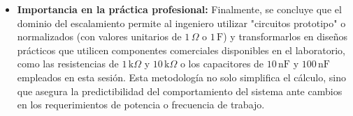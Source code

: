 \begin{itemize}
	\item \textbf{Importancia en la práctica profesional:} Finalmente, se concluye que el dominio del escalamiento permite al ingeniero utilizar "circuitos prototipo" o normalizados (con valores unitarios de $1\,\Omega$ o $1\,\text{F}$) y transformarlos en diseños prácticos que utilicen componentes comerciales disponibles en el laboratorio, como las resistencias de $1\,\text{k}\Omega$ y $10\,\text{k}\Omega$ o los capacitores de $10\,\text{nF}$ y $100\,\text{nF}$ empleados en esta sesión. Esta metodología no solo simplifica el cálculo, sino que asegura la predictibilidad del comportamiento del sistema ante cambios en los requerimientos de potencia o frecuencia de trabajo.
\end{itemize}